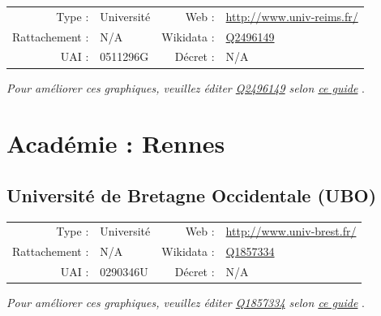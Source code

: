 \documentclass[11pt,french,landscape]{article}
\begin{document}
\begin{tabular*}{0.45\textwidth}{rp{2cm}rl}  
\hline  
Type : & Université & Web : &\href{http://www.univ-reims.fr/}{http://www.univ-reims.fr/} \\  
Rattachement : & N/A & Wikidata : & \href{https://www.wikidata.org/entity/Q2496149}{Q2496149} \\  
UAI : & 0511296G & Décret : & N/A \\  
\hline  
\end{tabular*}

\textit{\scriptsize Pour améliorer ces graphiques, veuillez éditer \href{https://www.wikidata.org/entity/Q2496149}{Q2496149}  selon \href{https://github.com/cpesr/wikidataESR/blob/master/Rmd/wikidataESR.md}{ce guide}}
.


\newpage

\hypertarget{acaduxe9mie-rennes}{%
\section{Académie : Rennes}\label{acaduxe9mie-rennes}}

\hypertarget{universituxe9-de-bretagne-occidentale-ubo}{%
\subsection{Université de Bretagne Occidentale
(UBO)}\label{universituxe9-de-bretagne-occidentale-ubo}}

\begin{tabular*}{0.45\textwidth}{rp{2cm}rl}  
\hline  
Type : & Université & Web : &\href{http://www.univ-brest.fr/}{http://www.univ-brest.fr/} \\  
Rattachement : & N/A & Wikidata : & \href{https://www.wikidata.org/entity/Q1857334}{Q1857334} \\  
UAI : & 0290346U & Décret : & N/A \\  
\hline  
\end{tabular*}

\textit{\scriptsize Pour améliorer ces graphiques, veuillez éditer \href{https://www.wikidata.org/entity/Q1857334}{Q1857334}  selon \href{https://github.com/cpesr/wikidataESR/blob/master/Rmd/wikidataESR.md}{ce guide}}
.

\end{document}
